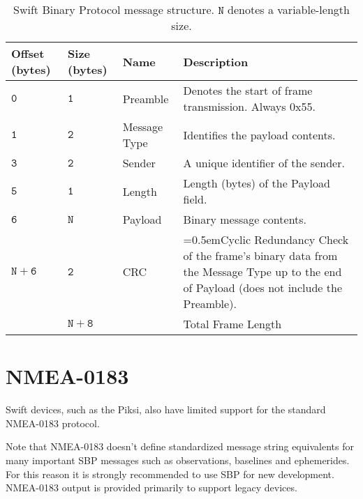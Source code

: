 \documentclass[9pt]{extarticle}
\numberwithin{table}{subsection}
\numberwithin{field}{subsection}
\begin{document}
\begin{table}[h]
  \centering
  \begin{tabularx}{\textwidth}{aaaX}
    \toprule
    Offset (bytes) & Size (bytes) & Name & Description \\
    \midrule
    $\mathtt{0}$ & $\mathtt{1}$ & {Preamble} & Denotes the start of frame transmission. Always 0x55. \\
    $\mathtt{1}$ & $\mathtt{2}$ & {Message Type} & Identifies the payload contents. \\
    $\mathtt{3}$ & $\mathtt{2}$ & {Sender} & A unique identifier of the sender.\footnotemark \\
    $\mathtt{5}$ & $\mathtt{1}$ & {Length} & Length (bytes) of the {Payload} field. \\
    $\mathtt{6}$ & $\mathtt{N}$ & {Payload} & Binary message contents. \\
    $\mathtt{N+6}$ & $\mathtt{2}$ & {CRC} & \hangindent=0.5em{Cyclic Redundancy Check of the frame's binary data from the Message Type up to the end of Payload (does not include the Preamble).} \\
    \midrule
    & $\mathtt{N+8}$ & &Total Frame Length \\
    \bottomrule
  \end{tabularx}
  \caption{Swift Binary Protocol message structure. $\mathtt{N}$ denotes a variable-length size.}
  \label{tab:message}
\end{table}

\section{NMEA-0183}
\label{sec:NMEA}

\begin{large}

Swift devices, such as the Piksi, also have limited support for the standard
NMEA-0183 protocol.

Note that NMEA-0183 doesn't define standardized message
string equivalents for many important SBP messages such as observations,
baselines and ephemerides. For this reason it is strongly recommended to use
SBP for new development. NMEA-0183 output is provided primarily to support
legacy devices.

\end{large}
\end{document}
